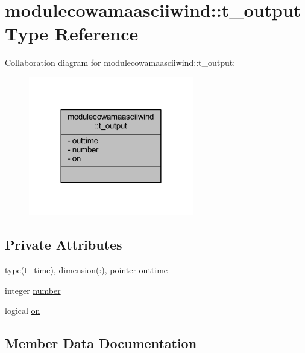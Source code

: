 \hypertarget{structmodulecowamaasciiwind_1_1t__output}{}\section{modulecowamaasciiwind\+:\+:t\+\_\+output Type Reference}
\label{structmodulecowamaasciiwind_1_1t__output}


Collaboration diagram for modulecowamaasciiwind\+:\+:t\+\_\+output\+:\nopagebreak
\begin{figure}[H]
\begin{center}
\leavevmode
\includegraphics[width=204pt]{structmodulecowamaasciiwind_1_1t__output__coll__graph}
\end{center}
\end{figure}
\subsection*{Private Attributes}
\begin{DoxyCompactItemize}
\item 
type(t\+\_\+time), dimension(\+:), pointer \mbox{\hyperlink{structmodulecowamaasciiwind_1_1t__output_a685e6b224e4609ae6ec1a438276fc467}{outtime}}
\item 
integer \mbox{\hyperlink{structmodulecowamaasciiwind_1_1t__output_ada7a50f4edb11b3a35d0f16482711e4a}{number}}
\item 
logical \mbox{\hyperlink{structmodulecowamaasciiwind_1_1t__output_a1e96a07771ddaf347f3d30504e4c9f88}{on}}
\end{DoxyCompactItemize}


\subsection{Member Data Documentation}
\mbox{\label{structmodulecowamaasciiwind_1_1t__output_ada7a50f4edb11b3a35d0f16482711e4a}} 
